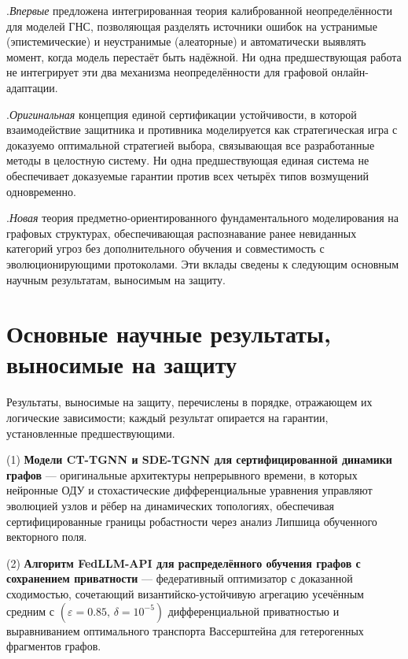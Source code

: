 .\quad \emph{Впервые} предложена интегрированная теория калиброванной неопределённости для моделей ГНС, позволяющая разделять источники ошибок на устранимые (эпистемические) и неустранимые (алеаторные) и автоматически выявлять момент, когда модель перестаёт быть надёжной. Ни одна предшествующая работа не интегрирует эти два механизма неопределённости для графовой онлайн-адаптации.

.\quad \emph{Оригинальная} концепция единой сертификации устойчивости, в которой взаимодействие защитника и противника моделируется как стратегическая игра с доказуемо оптимальной стратегией выбора, связывающая все разработанные методы в целостную систему. Ни одна предшествующая единая система не обеспечивает доказуемые гарантии против всех четырёх типов возмущений одновременно.

.\quad \emph{Новая} теория предметно-ориентированного фундаментального моделирования на графовых структурах, обеспечивающая распознавание ранее невиданных категорий угроз без дополнительного обучения и совместимость с эволюционирующими протоколами. Эти вклады сведены к следующим основным научным результатам, выносимым на защиту.


\section*{Основные научные результаты, выносимые на защиту}

Результаты, выносимые на защиту, перечислены в порядке, отражающем их логические зависимости; каждый результат опирается на гарантии, установленные предшествующими.

(1) \textbf{Модели CT-TGNN и SDE-TGNN для сертифицированной динамики графов} --- оригинальные архитектуры непрерывного времени, в которых нейронные ОДУ и стохастические дифференциальные уравнения управляют эволюцией узлов и рёбер на динамических топологиях, обеспечивая сертифицированные границы робастности через анализ Липшица обученного векторного поля.

(2) \textbf{Алгоритм FedLLM-API для распределённого обучения графов с сохранением приватности} --- федеративный оптимизатор с доказанной сходимостью, сочетающий византийско-устойчивую агрегацию усечённым средним с $(\varepsilon{=}0.85,\,\delta{=}10^{-5})$ дифференциальной приватностью и выравниванием оптимального транспорта Вассерштейна для гетерогенных фрагментов графов.

